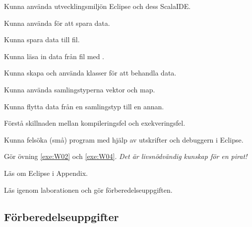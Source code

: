 


\Lab{\LabWeekFOUR}

\begin{Goals}
\item Kunna använda utvecklingsmiljön Eclipse och dess ScalaIDE.
\item Kunna använda  för att spara data.
\item Kunna spara data till fil.
\item Kunna l{\"a}sa in data fr{\aa}n fil med .
\item Kunna skapa och använda klasser för att behandla data.
\item Kunna använda samlingstyperna vektor och map.
\item Kunna flytta data från en samlingstyp till en annan.
\item Förstå skillnaden mellan kompileringsfel och exekveringsfel.
\item Kunna felsöka (små) program med hjälp av utskrifter och debuggern i Eclipse.

\end{Goals}

\begin{Preparations}
\item Gör övning \ref{exe:W02} och \ref{exe:W04}. \emph{Det är livsnödvändig kunskap för en pirat!}
\item Läs om Eclipse i Appendix.
\item Läs igenom laborationen och gör förberedelseuppgiften.
\end{Preparations}


\subsection{Förberedelseuppgifter}

